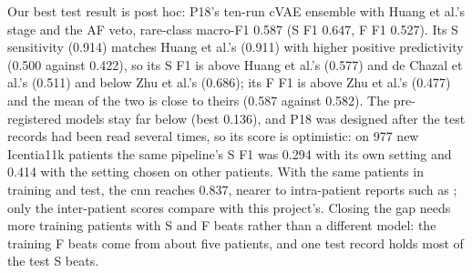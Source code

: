 Our best test result is post hoc: P18's ten-run cVAE ensemble with Huang et al.'s stage and the AF veto, rare-class macro-F1 0.587 (S F1 0.647, F F1 0.527). Its S sensitivity (0.914) matches Huang et al.'s (0.911) with higher positive predictivity (0.500 against 0.422), so its S F1 is above Huang et al.'s (0.577) and de Chazal et al.'s (0.511) and below Zhu et al.'s (0.686); its F F1 is above Zhu et al.'s (0.477) and the mean of the two is close to theirs (0.587 against 0.582). The pre-registered models stay far below (best 0.136), and P18 was designed after the test records had been read several times, so its score is optimistic: on 977 new Icentia11k patients the same pipeline's S F1 was 0.294 with its own setting and 0.414 with the setting chosen on other patients. With the same patients in training and test, the cnn reaches 0.837, nearer to intra-patient reports such as \cite{kwak2024diffusion}; only the inter-patient scores compare with this project's. Closing the gap needs more training patients with S and F beats rather than a different model: the training F beats come from about five patients, and one test record holds most of the test S beats.
